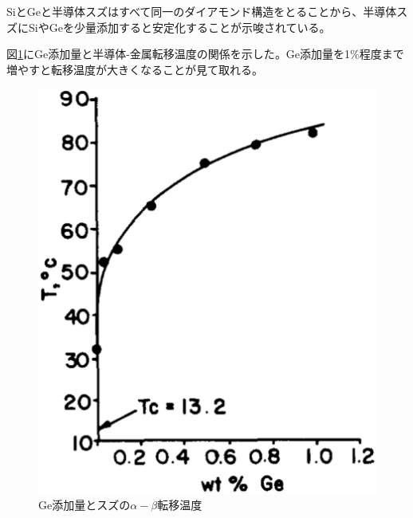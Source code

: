 SiとGeと半導体スズはすべて同一のダイアモンド構造をとることから、半導体スズにSiやGeを少量添加すると安定化することが示唆されている\cite{Ewald1954,Gallerneault1983}。

図\ref{fig:Ge_Stabilized_Sn}にGe添加量と半導体-金属転移温度の関係を示した\cite{Vnuk1984}。Ge添加量を1\%程度まで増やすと転移温度が大きくなることが見て取れる。
\begin{figure}[!h]
    \begin{center}
   \includegraphics[width=0.7\hsize]{Introduction/Ge_Stabilized_Sn.eps}
  \end{center}
  \caption{Ge添加量とスズの$\alpha-\beta$転移温度\cite{Vnuk1984}}
  \label{fig:Ge_Stabilized_Sn}
\end{figure}

